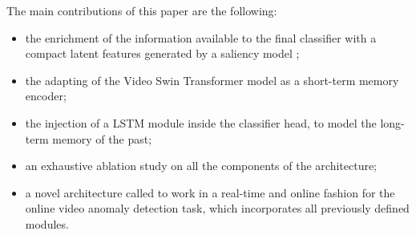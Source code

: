 The main contributions of this paper are the following:
\begin{itemize}
    \item the enrichment of the information available to the final classifier with a compact latent features generated by a saliency model \cite{cornia2016deep};
    \item the adapting of the Video Swin Transformer model \cite{liu_video_2022} as a short-term memory encoder;
    \item the injection of a LSTM module inside the classifier head, to model the long-term memory of the past;
    \item an exhaustive ablation study on all the components of the architecture;
    \item a novel architecture called  to work in a real-time and online fashion for the online video anomaly detection task, which incorporates all previously defined modules.
\end{itemize} 

